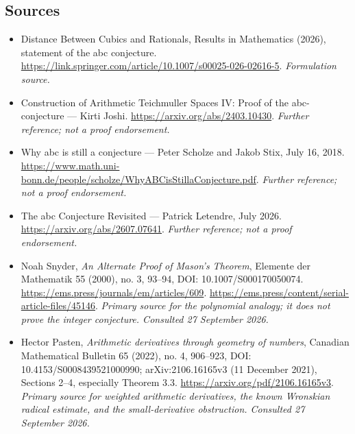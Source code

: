 \documentclass[11pt]{article}
\begin{document}
\subsection{Sources}
\begin{itemize}
\item[S1]Distance Between Cubics and Rationals, Results in Mathematics (2026), statement of the abc conjecture.
\url{https://link.springer.com/article/10.1007/s00025-026-02616-5}.
\textit{Formulation source.}
\item[S2]Construction of Arithmetic Teichmuller Spaces IV: Proof of the abc-conjecture — Kirti Joshi.
\url{https://arxiv.org/abs/2403.10430}.
\textit{Further reference; not a proof endorsement.}
\item[S3]Why abc is still a conjecture — Peter Scholze and Jakob Stix, July 16, 2018.
\url{https://www.math.uni-bonn.de/people/scholze/WhyABCisStillaConjecture.pdf}.
\textit{Further reference; not a proof endorsement.}
\item[S4]The abc Conjecture Revisited — Patrick Letendre, July 2026.
\url{https://arxiv.org/abs/2607.07641}.
\textit{Further reference; not a proof endorsement.}

\item[E1]Noah Snyder, \emph{An Alternate Proof of Mason's Theorem},
Elemente der Mathematik 55 (2000), no. 3, 93--94,
DOI: 10.1007/S000170050074.
\url{https://ems.press/journals/em/articles/609}.
\url{https://ems.press/content/serial-article-files/45146}.
\textit{Primary source for the polynomial analogy; it does not prove
the integer conjecture. Consulted 27 September 2026.}
\item[E2]Hector Pasten, \emph{Arithmetic derivatives through geometry
of numbers}, Canadian Mathematical Bulletin 65 (2022), no. 4, 906--923,
DOI: 10.4153/S0008439521000990; arXiv:2106.16165v3 (11 December 2021),
Sections 2--4, especially Theorem 3.3.
\url{https://arxiv.org/pdf/2106.16165v3}.
\textit{Primary source for weighted arithmetic derivatives, the known
Wronskian radical estimate, and the small-derivative obstruction.
Consulted 27 September 2026.}
\end{itemize}
\end{document}
